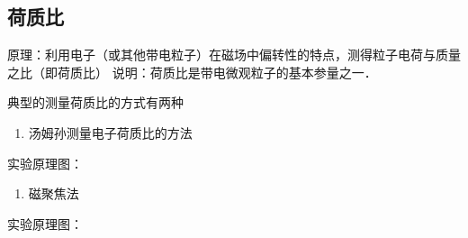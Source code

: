 
\subsection{荷质比}
原理：利用电子（或其他带电粒子）在磁场中偏转性的特点，测得粒子电荷与质量之比（即荷质比）
说明：荷质比是带电微观粒子的基本参量之一．

典型的测量荷质比的方式有两种
\begin{enumerate}
\item 汤姆孙测量电子荷质比的方法
\end{enumerate}

实验原理图：


\begin{enumerate}
\item 磁聚焦法
\end{enumerate}

实验原理图：

